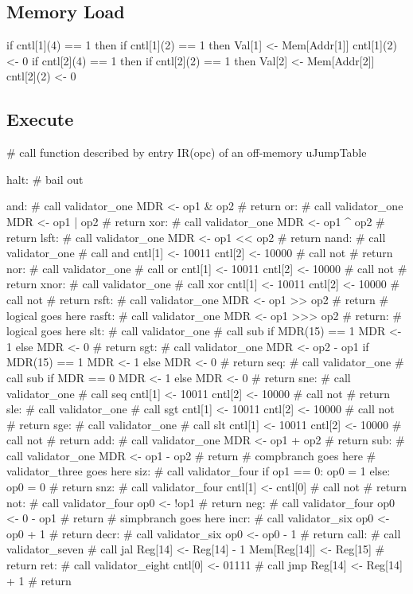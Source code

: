 \documentclass[12pt]{article}
\begin{document}
\subsection{Memory Load}
\begin{verbatimtab}
if cntl[1](4) == 1 then
    if cntl[1](2) == 1 then
        Val[1] <- Mem[Addr[1]]
        cntl[1](2) <- 0
if cntl[2](4) == 1 then
    if cntl[2](2) == 1 then
        Val[2] <- Mem[Addr[2]]
        cntl[2](2) <- 0
\end{verbatimtab}

\subsection{Execute}
\begin{verbatimtab}
# call function described by entry IR(opc) of an off-memory uJumpTable

halt:
# bail out

and:
    # call validator_one
    MDR <- op1 & op2
    # return
or:
    # call validator_one
    MDR <- op1 | op2
    # return
xor:
    # call validator_one
    MDR <- op1 ^ op2
    # return
lsft:
    # call validator_one
    MDR <- op1 << op2
    # return
nand:
    # call validator_one
    # call and
    cntl[1] <- 10011
    cntl[2] <- 10000
    # call not
    # return
nor:
    # call validator_one
    # call or
    cntl[1] <- 10011
    cntl[2] <- 10000
    # call not
    # return
xnor:
    # call validator_one
    # call xor
    cntl[1] <- 10011
    cntl[2] <- 10000
    # call not
    # return
rsft:
    # call validator_one
    MDR <- op1 >> op2
    # return
# logical goes here
rasft:
    # call validator_one
    MDR <- op1 >>> op2
    # return:
# logical goes here
slt:
    # call validator_one
    # call sub
    if MDR(15) == 1
        MDR <- 1
    else
        MDR <- 0
    # return
sgt:
    # call validator_one
    MDR <- op2 - op1
    if MDR(15) == 1
        MDR <- 1
    else
        MDR <- 0
    # return
seq:
    # call validator_one
    # call sub
    if MDR == 0
        MDR <- 1
    else
        MDR <- 0
    # return
sne:
    # call validator_one
    # call seq
    cntl[1] <- 10011
    cntl[2] <- 10000
    # call not
    # return
sle:
    # call validator_one
    # call sgt
    cntl[1] <- 10011
    cntl[2] <- 10000
    # call not
    # return
sge:
    # call validator_one
    # call slt
    cntl[1] <- 10011
    cntl[2] <- 10000
    # call not
    # return    
add:
    # call validator_one
    MDR <- op1 + op2
    # return
sub:
    # call validator_one
    MDR <- op1 - op2
    # return
# compbranch goes here
# validator_three goes here
siz:
    # call validator_four
    if op1 == 0:
       op0 = 1
    else:
       op0 = 0
    # return
snz:
    # call validator_four
    cntl[1] <- cntl[0]    
    # call not
    # return
not:
    # call validator_four
    op0 <- !op1
    # return
neg:
    # call validator_four
    op0 <- 0 - op1
    # return
# simpbranch goes here
incr:
	# call validator_six
	op0 <- op0 + 1
	# return
decr:
	# call validator_six
	op0 <- op0 - 1
	# return
call:
	# call validator_seven
	# call jal
	Reg[14] <- Reg[14] - 1
	Mem[Reg[14]] <- Reg[15]
	# return
ret:
	# call validator_eight
	cntl[0] <- 01111
	# call jmp
	Reg[14] <- Reg[14] + 1
	# return


\end{verbatimtab}
\end{document}
